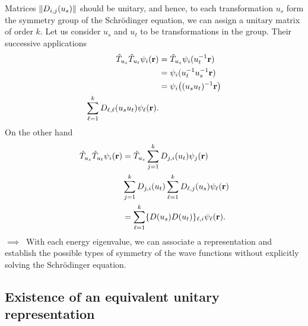 Matrices $\norm{D_{i,j}(u_s)}$ should be unitary, and hence, to each
transformation $u_s$ form the symmetry group of the Schrödinger equation, we
can assign a unitary matrix of order $k$. Let us consider $u_s$ and $u_t$ to be
transformations in the group. Their successive applications
\begin{align}
    \hat{T}_{u_s}\hat{T}_{u_t}\psi_i(\vb{r})&=
    \hat{T}_{u_s}\psi_i(u^{-1}_t\vb{r})\\
                                            &=\psi_i(u^{-1}_tu^{-1}_s\vb{r})\\
                                            &=\psi_i\qty((u_su_t)^{-1}\vb{r})\\
                                            \sum_{\ell=1}^kD_{\ell,\ell}(u_su_t)\psi_\ell(\vb{r}).
\end{align}
On the other hand
\begin{align}
    \hat{T}_{u_s}\hat{T}_{u_t}\psi_i(\vb{r})&=\hat{T}_{u_s}\sum_{j=1}^kD_{j,i}(u_t)\psi_j(\vb{r})\\
                                            &\sum_{j=1}^kD_{j,i}(u_t)\sum_{\ell=1}^kD_{\ell,j}(u_s)\psi_\ell(\vb{r})\\
                                            &=\sum_{\ell=1}^k\{D(u_s)D(u_t)\}_{\ell,i}\psi_\ell(\vb{r}).
\end{align}
$\implies\ $ With each energy eigenvalue, we can associate a representation and
establish the possible types of symmetry of the wave functions without
explicitly solving the Schrödinger equation.

\subsection{Existence of an equivalent unitary representation} %
\label{sub:Existance of an equivalent unitary representation}

